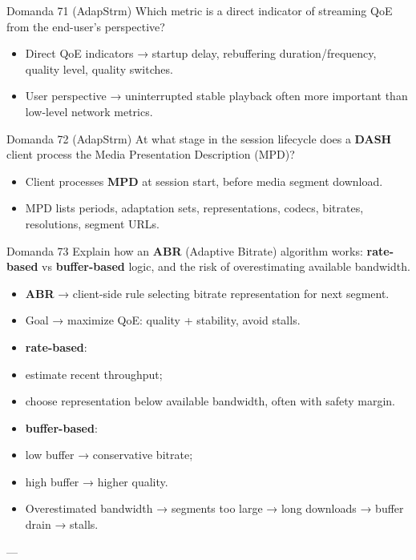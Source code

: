 \begin{questionbox}{Domanda 71}
(AdapStrm) Which metric is a direct indicator of streaming QoE from the end-user’s perspective?
\end{questionbox}


\begin{itemize}
  \item Direct QoE indicators → startup delay, rebuffering duration/frequency, quality level, quality switches.
  \item User perspective → uninterrupted stable playback often more important than low-level network metrics.
\end{itemize}



\begin{questionbox}{Domanda 72}
(AdapStrm) At what stage in the session lifecycle does a \textbf{DASH} client process the Media Presentation Description (MPD)?
\end{questionbox}


\begin{itemize}
  \item Client processes \textbf{MPD} at session start, before media segment download.
  \item MPD lists periods, adaptation sets, representations, codecs, bitrates, resolutions, segment URLs.
\end{itemize}



\begin{questionbox}{Domanda 73}
Explain how an \textbf{ABR} (Adaptive Bitrate) algorithm works: \textbf{\textbf{rate}-based} vs \textbf{buffer-based} logic, and the risk of overestimating available bandwidth.
\end{questionbox}


\begin{itemize}
  \item \textbf{\textbf{ABR}} → client-side rule selecting bitrate representation for next segment.
  \item Goal → maximize QoE: quality + stability, avoid stalls.
  \item \textbf{\textbf{rate}-based}:
  \item estimate recent throughput;
  \item choose representation below available bandwidth, often with safety margin.
  \item \textbf{buffer-based}:
  \item low buffer → conservative bitrate;
  \item high buffer → higher quality.
  \item Overestimated bandwidth → segments too large → long downloads → buffer drain → stalls.
\end{itemize}

---


